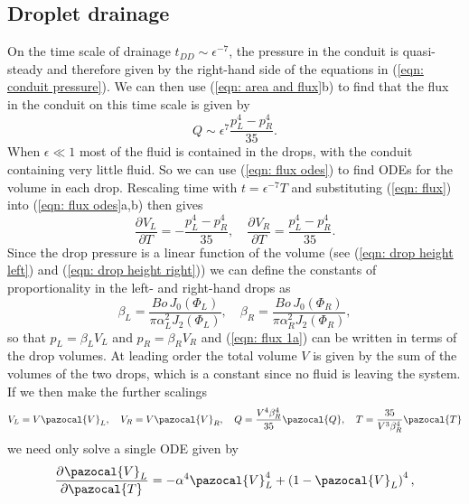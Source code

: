 \documentclass{jfm}
\newcommand{\pD}[3]{\frac{ \partial^{#3} {#1} }{ \partial {#2}^{#3} }}
\newcommand{\besselj}[2]{J_{#1}\!\left(#2\right)}
\begin{document}
\subsection{Droplet drainage} \label{sec: drainage}
On the time scale of drainage $t_{DD} \sim \epsilon^{-7} $, the pressure in the  conduit  is quasi-steady   and therefore given by the right-hand side of the equations in  (\ref{eqn:  conduit  pressure}).
We can then use (\ref{eqn: area and flux}b) to find that the flux in the conduit on this time scale is given by  
\begin{equation}
 Q  \sim  \epsilon^7 \frac{p_L^4-p_R^4}{35}. \label{eqn: flux}
\end{equation}
When $\epsilon \ll 1$   most of the fluid is contained in   the drops, with the  conduit  containing very little fluid.
So we can use   (\ref{eqn: flux odes}) to find ODEs for the volume in each drop.
Rescaling time with $t = \epsilon^{-7}  T$ and  substituting (\ref{eqn: flux}) into     (\ref{eqn: flux odes}a,b)  then gives
\label{eqn: flux 1a} 
 \begin{equation}
 \pD{V_L}{T}{}= -\frac{p_L^4-p_R^4}{35}, \quad  \pD{V_R}{T}{}= \frac{p_L^4-p_R^4}{35}.  \tag{\theequation a,b} 
 \end{equation}
Since  the drop pressure is a linear function of the volume (see (\ref{eqn: drop height left}) and (\ref{eqn: drop height right})) we can define the constants  of proportionality in the left- and right-hand drops as
\label{eqn: betas}
\begin{equation}
\beta_{L} = \frac{ Bo \, \besselj{0}{\Phi_{L} }}{\pi \alpha_{L}^2  \besselj{2}{\Phi_{L}}}  , \quad \beta_{R} = \frac{ Bo \, \besselj{0}{\Phi_{R} }}{\pi \alpha_{R}^2  \besselj{2}{\Phi_{R}}}  ,  \tag{\theequation a,b} 
\end{equation}
so that $p_L=\beta_L V_L$ and $p_R = \beta_R V_R$  and  (\ref{eqn: flux 1a}) can be written in terms of the drop volumes.
At leading order the total  volume $V$   is given by the sum of the volumes of the two drops, which is a constant since no fluid is leaving the system.
If  we then make the further scalings
\begin{equation*}
V_L = V \pazocal{V}_L, \quad V_R = V \pazocal{V}_R, \quad Q =  \frac { V^4  \beta_R^4 } { 35}  {\pazocal{Q}}  ,\quad T =   \frac{ 35} { V^3  \beta_R^4 }   {\pazocal{T}}    
\end{equation*}
 we  need only solve a single  ODE given by 
\begin{equation}
 \pD{\pazocal{V}_L}{\pazocal{T}}{} =-\alpha^4\pazocal{V}_L^4 + \left( 1-\pazocal{V}_L \right)^4, \label{eqn: volume ode}
\end{equation}
\end{document}
